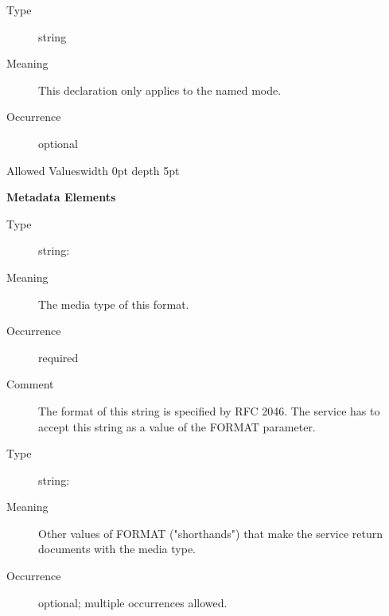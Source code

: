 \documentclass{ivoa}
\begin{document}
\begin{generated}
\begin{bigdescription}
\item[forMode]
\begin{description}
\item[Type] string
\item[Meaning] This declaration only applies to the named mode.
\item[Occurrence] optional

\item[Allowed Values\vrule width 0pt depth 5pt]\hfil
\end{description}

\end{bigdescription}\endgroup



\vspace{0.5ex}\noindent\textbf{ Metadata Elements}

\begingroup\small\begin{bigdescription}\item[Element \xmlel{mime}]
\begin{description}
\item[Type] string: 
\item[Meaning] The media type of this format.
\item[Occurrence] required
\item[Comment] The format of this string is specified by RFC 2046.
          The service has to accept this string as a
          value of the FORMAT parameter.

\end{description}
\item[Element \xmlel{alias}]
\begin{description}
\item[Type] string: 
\item[Meaning] Other values of FORMAT ({"}shorthands{"}) that make the service return
          documents with the media type.
\item[Occurrence] optional; multiple occurrences allowed.

\end{description}


\end{bigdescription}\endgroup

\endgroup
\end{generated}
\end{document}
